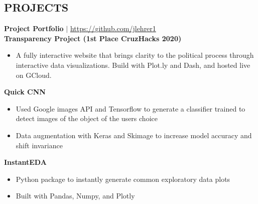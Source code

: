 \documentclass[margin]{res}
\begin{document}
\begin{resume}
\section{PROJECTS}
    \textbf{Project Portfolio} $\mid$ \textcolor{blue}{\href{https://github.com/jlehrer1}{https://github.com/jlehrer1}} \vspace {2mm} \\
    \textbf{Transparency Project (1st Place CruzHacks 2020)}
    \begin{itemize}
        \item A fully interactive website that brings clarity to the political process through interactive data visualizations. Build with Plot.ly and Dash, and hosted live on GCloud.
    \end{itemize}\vspace*{-8pt}
   \textbf{Quick CNN}
    \begin{itemize}
        \item Used Google images API and Tensorflow to generate a classifier  trained to detect images of the object of the users choice
        \item Data augmentation with Keras and Skimage to increase model accuracy and shift invariance
    \end{itemize}\vspace*{-8pt}
    \textbf{InstantEDA}
    \begin{itemize}
        \item Python package to instantly generate common exploratory data plots
        \item Built with Pandas, Numpy, and Plotly 
    \end{itemize}\vspace*{-8pt}


\end{resume}
\end{document}

